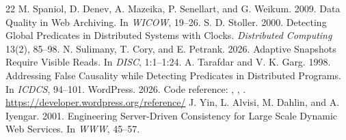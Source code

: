 \begin{thebibliography}{22}
 M. Spaniol, D. Denev, A. Mazeika, P. Senellart, and G. Weikum.
2009. Data Quality in Web Archiving. In \emph{WICOW}, 19--26.
 S. D. Stoller. 2000. Detecting Global Predicates in
Distributed Systems with Clocks. \emph{Distributed Computing} 13(2), 85--98.
 N. Sulimany, T. Cory, and E. Petrank. 2026. Adaptive
Snapshots Require Visible Reads. In \emph{DISC}, 1:1--1:24.
 A. Tarafdar and V. K. Garg. 1998. Addressing False
Causality while Detecting Predicates in Distributed Programs. In \emph{ICDCS},
94--101.
 WordPress. 2026. Code reference:
,
,
.
\url{https://developer.wordpress.org/reference/}
 J. Yin, L. Alvisi, M. Dahlin, and A. Iyengar. 2001.
Engineering Server-Driven Consistency for Large Scale Dynamic Web Services. In
\emph{WWW}, 45--57.
\end{thebibliography}
